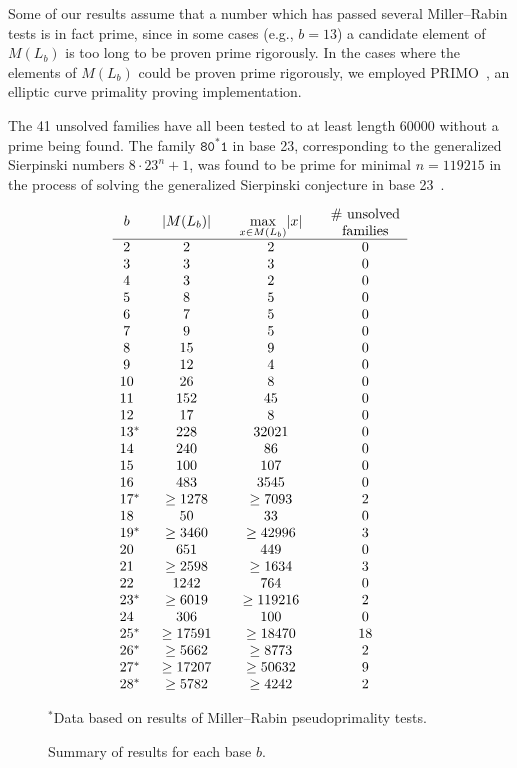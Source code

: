 \documentclass[12pt]{article}
\theoremstyle{plain}
\theoremstyle{definition}
\theoremstyle{remark}
\newcommand{\0}{\mathtt{0}}
\newcommand{\1}{\mathtt{1}}
\newcommand{\2}{\mathtt{2}}
\newcommand{\3}{\mathtt{3}}
\newcommand{\4}{\mathtt{4}}
\newcommand{\5}{\mathtt{5}}
\newcommand{\6}{\mathtt{6}}
\newcommand{\7}{\mathtt{7}}
\newcommand{\8}{\mathtt{8}}
\newcommand{\9}{\mathtt{9}}
\begin{document}
Some of our results assume that a number which has passed several Miller--Rabin
tests is in fact prime, since in some cases (e.g., $b=13$) a candidate
element of $M(L_b)$ is too long to be proven prime rigorously.
In the cases where the elements of $M(L_b)$ could be proven prime rigorously,
we employed PRIMO~\cite{primo}, an elliptic curve primality proving implementation.

The 41 unsolved families have all been tested to at least length 60000 without
a prime being found.  The family $\8\0^*\1$ in base 23, corresponding to the
generalized Sierpinski numbers $8\cdot23^n+1$, was found to be prime
for minimal $n=119215$ in the process
of solving the generalized Sierpinski conjecture in base 23~\cite{crus}.

\begin{figure}\[\begin{array}{c@{\qquad}c@{\qquad}c@{\qquad}c}
b & \lvert M(L_b)\rvert & \max\limits_{x\in M(L_b)}\lvert x\rvert & \parbox{5em}{\centering\# unsolved\\families} \\ \hline
2 & 2 & 2 & 0 \\ 
3 & 3 & 3 & 0 \\ 
4 & 3 & 2 & 0 \\ 
5 & 8 & 5 & 0 \\ 
6 & 7 & 5 & 0 \\ 
7 & 9 & 5 & 0 \\ 
8 & 15 & 9 & 0 \\ 
9 & 12 & 4 & 0 \\ 
10 & 26 & 8 & 0 \\ 
11 & 152 & 45 & 0 \\ 
12 & 17 & 8 & 0 \\ 
13\mathrlap{^*} & 228 & 32021 & 0 \\ 
14 & 240 & 86 & 0 \\ 
15 & 100 & 107 & 0 \\ 
16 & 483 & 3545 & 0 \\ 
17\mathrlap{^*} & \geq1278 & \geq7093 & 2 \\ 
18 & 50 & 33 & 0 \\ 
19\mathrlap{^*} & \geq3460 & \geq42996 & 3 \\ 
20 & 651 & 449 & 0 \\ 
21 & \geq2598 & \geq1634 & 3 \\ 
22 & 1242 & 764 & 0 \\ 
23\mathrlap{^*} & \geq6019 & \geq119216 & 2 \\ 
24 & 306 & 100 & 0 \\ 
25\mathrlap{^*} & \geq17591 & \geq18470 & 18 \\ 
26\mathrlap{^*} & \geq5662 & \geq8773 & 2 \\ 
27\mathrlap{^*} & \geq17207 & \geq50632 & 9 \\ 
28\mathrlap{^*} & \geq5782 & \geq4242 & 2 
\end{array}\]
\begin{center}$^*$Data based on results of Miller--Rabin pseudoprimality tests.\end{center}
\caption{Summary of results for each base $b$.}
\label{resultsfig}
\end{figure}
\end{document}
